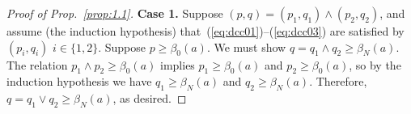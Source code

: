 \begin{proof}[Proof of Prop.~\ref{prop:1.1}]
  
    
    \medskip
    \noindent \textbf{Case 1.}
    Suppose $(p,q) = (p_1, q_1) \wedge (p_2, q_2)$, and assume (the induction hypothesis) 
    that~(\ref{eq:dcc01})--(\ref{eq:dcc03}) are satisfied 
    by $(p_i,q_i)$ $i\in \{1,2\}$.
    Suppose $p \geq \beta_0(a)$. We must show $q=q_1\wedge q_2 \geq \beta_N(a)$.
    The relation $p_1\wedge p_2 \geq \beta_0(a)$ implies 
    $p_1\geq \beta_0(a)$ and $p_2\geq \beta_0(a)$, 
    so by the induction hypothesis we have 
    $q_1\geq \beta_N(a)$ and $q_2\geq \beta_N(a)$.  
    Therefore, $q = q_1 \vee q_2 \geq \beta_N(a)$, as desired.
    


\end{proof}

